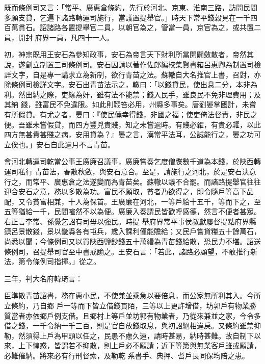 \begin{pinyinscope}
 既而條例司又言：「常平、廣惠倉條約，先行於河北、京東、淮南三路，訪問民間多願支貸，乞遍下諸路轉運司施行，當議置提舉官。」時天下常平錢穀見在一千四百萬貫石。詔諸路各置提舉官二員，以朝官為之，管當一員，京官為之，或共置二員，開封
 府界一員，凡四十一人。



 初，神宗既用王安石為參知政事，安石為帝言天下財利所當開闢斂散者，帝然其說，遂創立制置三司條例司。安石因請以著作佐郎編校集賢書箱呂惠卿為制置司檢詳文字，自是專一講求立為新制，欲行青苗之法。蘇轍自大名推官上書，召對，亦除條例司檢詳文字。安石出青苗法示之，轍曰：「以錢貸民，使出息二分，本非為利。然出納之際，吏緣為奸，雖有法不能禁；錢入民手，雖良民不免非理費用；及其納
 錢，雖富民不免違限。如此則鞭笞必用，州縣多事矣。唐劉晏掌國計，未嘗有所假貸。有尤之者，晏曰：『使民僥幸得錢，非國之福；使吏倚法督責，非民之便。吾雖未嘗假貸，而四方豐兇貴賤，知之未嘗逾時。有賤必糴，有貴必糶，以此四方無甚貴甚賤之病，安用貸為？』晏之言，漢常平法耳，公誠能行之，晏之功可立俟也。」安石自此逾月不言青苗。



 會河北轉運司乾當公事王廣廉召議事，廣廉嘗奏乞度僧牒數千道為本錢，於陜西轉運司私行
 青苗法，春散秋斂，與安石意合。至是，請施行之河北，於是安石決意行之，而常平、廣惠倉之法遂變而為青苗矣。蘇轍以議不合罷。而諸路提舉官往往迎合安石之意，務以多散為功。富民不願取，貧者乃欲得之，即令隨戶等高下品配，又令貧富相兼，十人為保首。王廣廉在河北，一等戶給十五千，等而下之，至五等猶給一千，民間喧然不以為便。廣廉入奏謂民皆歡呼感德，然言不便者甚眾。右正言李常、孫覺乞詔有司毋以強民。時提
 舉府界常平事侯叔獻屢督提點府界縣鎮呂景散錢，景以畿縣各有屯兵，歲入課利僅能贍給；又民戶嘗貸糧五十餘萬石，尚悉以聞；今條例司又以買陜西鹽鈔錢五十萬緡為青苗錢給散，恐民力不堪。詔送條例司，召提舉司官至中書戒諭之。王安石言：「若此，諸路必顧望，不敢推行新法，第令條例司指揮。」從之。



 三年，判大名府韓琦言：



 臣準散青苗詔書，務在惠小民，不使兼並乘急以要倍息，而公家無所利其入。今所立條約，乃自鄉
 戶一等而下皆立借錢貫陌，三等以上更許增借，坊郭戶有物業勝質當者亦依鄉戶例支借。且鄉村上等戶並坊郭有物業者，乃從來兼並之家，今令多借之錢，一千令納一千三百，則是官自放錢取息，與初詔絕相違戾。又條約雖禁抑勒，然須得上戶為甲頭以任之，民愚不慮久遠，請時甚易，納時甚難。故自制下以來，上下惶惑，皆謂若不抑散，則上戶必不願請；近下等第與無業客戶雖或願請，必難催納。將來必有行刑督索，及勒乾
 系書手、典押、耆戶長同保均陪之患。




\end{pinyinscope}
